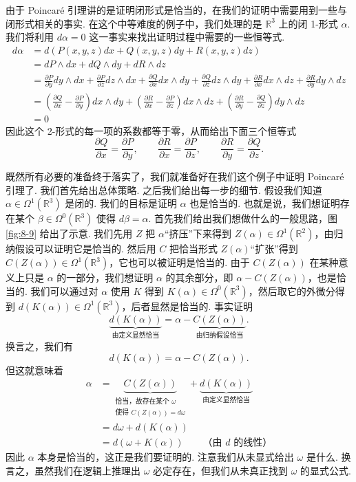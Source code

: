由于 Poincaré 引理讲的是证明闭形式是恰当的，在我们的证明中需要用到一些与闭形式相关的事实. 在这个中等难度的例子中，我们处理的是 $\mathbb{R}^3$ 上的闭 1-形式 $\alpha$. 我们将利用 $d\alpha=0$ 这一事实来找出证明过程中需要的一些恒等式.
\[
\begin{aligned}
d\alpha &= d\left(P(x,y,z)dx+Q(x,y,z)dy+R(x,y,z)dz\right)\\
&= dP\wedge dx+dQ\wedge dy+dR\wedge dz\\
&= \frac{\partial P}{\partial y}dy\wedge dx+\frac{\partial P}{\partial z}dz\wedge dx
  +\frac{\partial Q}{\partial x}dx\wedge dy+\frac{\partial Q}{\partial z}dz\wedge dy
  +\frac{\partial R}{\partial x}dx\wedge dz+\frac{\partial R}{\partial y}dy\wedge dz\\
&= \left(\frac{\partial Q}{\partial x}-\frac{\partial P}{\partial y}\right)dx\wedge dy
  +\left(\frac{\partial R}{\partial x}-\frac{\partial P}{\partial z}\right)dx\wedge dz
  +\left(\frac{\partial R}{\partial y}-\frac{\partial Q}{\partial z}\right)dy\wedge dz\\
&= 0
\end{aligned}
\]
因此这个 2-形式的每一项的系数都等于零，从而给出下面三个恒等式
\[
\frac{\partial Q}{\partial x}=\frac{\partial P}{\partial y},\qquad
\frac{\partial R}{\partial x}=\frac{\partial P}{\partial z},\qquad
\frac{\partial R}{\partial y}=\frac{\partial Q}{\partial z}.
\]

既然所有必要的准备终于落实了，我们就准备好在我们这个例子中证明 Poincaré 引理了. 我们首先给出总体策略. 之后我们给出每一步的细节. 假设我们知道 $\alpha\in\Omega^1(\mathbb{R}^3)$ 是闭的. 我们的目标是证明 $\alpha$ 也是恰当的. 也就是说，我们想证明存在某个 $\beta\in\Omega^0(\mathbb{R}^3)$ 使得 $d\beta=\alpha$. 首先我们给出我们想做什么的一般思路，图 \ref{fig:8-9} 给出了示意. 我们先用 $Z$ 把 $\alpha$``挤压''下来得到 $Z(\alpha)\in\Omega^1(\mathbb{R}^2)$，由归纳假设可以证明它是恰当的. 然后用 $C$ 把恰当形式 $Z(\alpha)$``扩张''得到 $C(Z(\alpha))\in\Omega^1(\mathbb{R}^3)$，它也可以被证明是恰当的. 由于 $C(Z(\alpha))$ 在某种意义上只是 $\alpha$ 的一部分，我们想证明 $\alpha$ 的其余部分，即 $\alpha-C(Z(\alpha))$，也是恰当的. 我们可以通过对 $\alpha$ 使用 $K$ 得到 $K(\alpha)\in\Omega^0(\mathbb{R}^3)$，然后取它的外微分得到 $d(K(\alpha))\in\Omega^1(\mathbb{R}^3)$，后者显然是恰当的. 事实证明
\[
\underbrace{d(K(\alpha))}_{\text{由定义显然恰当}}=\alpha-\underbrace{C(Z(\alpha))}_{\text{由归纳假设恰当}}.
\]
换言之，我们有
\[
d(K(\alpha))=\alpha-C(Z(\alpha)).
\]
但这就意味着
\[
\begin{aligned}
\alpha &= \underbrace{C(Z(\alpha))}_{\substack{\text{恰当，故存在某个 }\omega\\\text{使得 }C(Z(\alpha))=d\omega}}+\underbrace{d(K(\alpha))}_{\text{由定义显然恰当}}\\
&= d\omega+d(K(\alpha))\\
&= d\left(\omega+K(\alpha)\right)\qquad\text{（由 }d\text{ 的线性）}
\end{aligned}
\]
因此 $\alpha$ 本身是恰当的，这正是我们要证明的. 注意我们从未显式给出 $\omega$ 是什么. 换言之，虽然我们在逻辑上推理出 $\omega$ 必定存在，但我们从未真正找到 $\omega$ 的显式公式.

